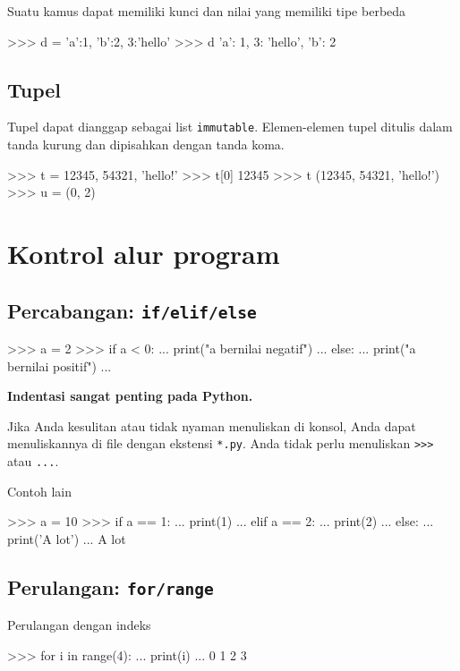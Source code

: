 \documentclass[a4paper,11pt]{extarticle}
\begin{document}
Suatu kamus dapat memiliki kunci dan nilai yang memiliki tipe berbeda
\begin{pyconcode}
>>> d = {'a':1, 'b':2, 3:'hello'}
>>> d
{'a': 1, 3: 'hello', 'b': 2}
\end{pyconcode}

\subsection{Tupel}
Tupel dapat dianggap sebagai list \texttt{immutable}.
Elemen-elemen tupel ditulis dalam tanda kurung dan dipisahkan dengan
tanda koma.
\begin{pyconcode}
>>> t = 12345, 54321, 'hello!'
>>> t[0]
12345
>>> t
(12345, 54321, 'hello!')
>>> u = (0, 2)
\end{pyconcode}



\section{Kontrol alur program}

\subsection{Percabangan: \texttt{if/elif/else}}
  
\begin{pyconcode}
>>> a = 2
>>> if a < 0:
...     print("a bernilai negatif")
... else:
...     print("a bernilai positif")
... 
\end{pyconcode}


\textbf{Indentasi sangat penting pada Python.}

Jika Anda kesulitan atau tidak nyaman menuliskan di konsol, Anda
dapat menuliskannya di file dengan ekstensi \texttt{*.py}.
Anda tidak perlu menuliskan \verb|>>>| atau \verb|...|.

Contoh lain
\begin{pyconcode}
>>> a = 10 
>>> if a == 1:
...     print(1)
... elif a == 2:
...     print(2)
... else:
...     print('A lot')
... 
A lot
\end{pyconcode}


\subsection{Perulangan: \texttt{for/range}}

Perulangan dengan indeks
\begin{pyconcode}
>>> for i in range(4):
...     print(i)
... 
0
1
2
3
\end{pyconcode}
\end{document}
